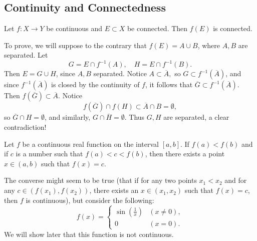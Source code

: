 \documentclass{article}
\begin{document}
\subsection{Continuity and Connectedness}
\begin{theorem}
    Let $f:X\rightarrow Y$ be continuous and $E\subset X$ be connected. Then $f(E)$ is connected.
\end{theorem}
\begin{remark}
    To prove, we will suppose to the contrary that $f(E)=A\cup B$, where $A,B$ are separated. Let \[G=E\cap f^{-1}(A),\quad H=E\cap f^{-1}(B).\]Then $E=G\cup H$, since $A,B$ separated. Notice $A\subset \overline{A},$ so $G\subset f^{-1}(\overline{A})$, and since $f^{-1}(\overline{A})$ is closed by the continuity of $f$, it follows that $\overline{G}\subset f^{-1}(\overline{A})$. Then $f(\overline{G})\subset \overline{A}$. Notice \[f(\overline{G})\cap f(H)\subset \overline{A}\cap B=\emptyset,\]so $\overline{G}\cap H=\emptyset$, and similarly, $G\cap \overline{H}=\emptyset$. Thus $G,H$ are separated, a clear contradiction!
\end{remark}
\begin{theorem}
    Let $f$ be a continuous real function on the interval $[a,b]$. If $f(a)<f(b)$ and if $c$ is a number such that $f(a)<c<f(b)$, then there exists a point $x\in(a,b)$ such that $f(x)=c$.
\end{theorem}
\begin{remark}
    The converse might seem to be true (that if for any two points $x_{1}<x_{2}$ and for any $c\in(f(x_{1}),f(x_{2}))$, there exists an $x\in(x_{1},x_{2})$ such that $f(x)=c$, then $f$ is continuous), but consider the following:
    \[f(x)=\begin{cases}
        \sin(\frac{1}{x}) & (x\neq 0),\\
        0 & (x=0).
    \end{cases}\]
    We will show later that this function is not continuous.
\end{remark}
\end{document}
